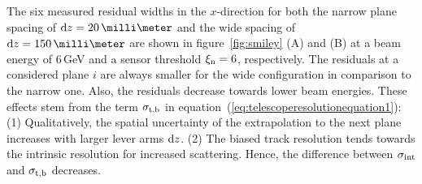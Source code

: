 The six measured residual widths in the $x$-direction for both the narrow plane spacing of $\dz = 20\,\milli\meter$ and the wide spacing of $\dz = 150\,\milli\meter$ are shown in figure~\ref{fig:smiley} (A) and (B)
 at a beam energy of 6\,GeV and a sensor threshold $\xi_{\textrm{n}} = 6$, respectively. 
The residuals at a considered plane $i$ are always smaller for the wide configuration in comparison to the narrow one. 
Also, the residuals decrease towards lower beam energies. 
These effects stem from the term $\sigma_{\textrm{t,b}}$ in equation~(\ref{eq:telescoperesolutionequation1}): 
(1) Qualitatively, the spatial uncertainty of the extrapolation to the next plane increases with larger lever arms $\textrm{d}z$. 
(2) The biased track resolution tends towards the intrinsic resolution for increased scattering. 
Hence, the difference between $\sigma_{\textrm{int}}$ and $\sigma_{\textrm{t,b}}$ decreases. 


%


